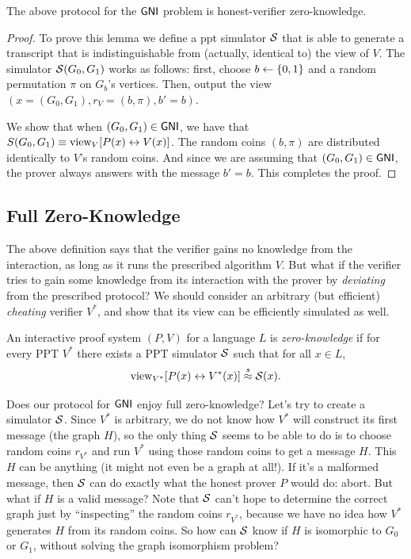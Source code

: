 \documentclass[11pt]{article}
\begin{document}
\begin{lemma}
  \label{lem:gni-hvzk}
  The above protocol for the $\mathsf{GNI}$ problem is honest-verifier
  zero-knowledge.
\end{lemma}

\begin{proof}
  To prove this lemma we define a ppt simulator $\mathcal{S}$ that is able to
  generate a transcript that is indistinguishable from (actually,
  identical to) the view of $V$. The simulator $\mathcal{S}(G_{0}, G_{1})$
  works as follows: first, choose $b \gets \{0,1\}$ and a random
  permutation $\pi$ on $G_{b}$'s vertices.  Then, output the view $(x
  = (G_{0}, G_{1}), r_V=(b,\pi), b' = b)$.
  
  We show that when $(G_0,G_1) \in \mathsf{GNI}$, we have that $S(G_0,G_1)
  \equiv \text{view}_V[P(x)\leftrightarrow V(x)]$.  The random coins
  $(b,\pi)$ are distributed identically to $V$'s random coins.  And
  since we are assuming that $(G_0,G_1) \in \mathsf{GNI}$, the prover always
  answers with the message $b'=b$.  This completes the proof.
\end{proof}

\subsection{Full Zero-Knowledge}
\label{sec:full-zero-knowledge}

The above definition says that the verifier gains no knowledge from
the interaction, as long as it runs the prescribed algorithm $V$.  But
what if the verifier tries to gain some knowledge from its interaction
with the prover by \emph{deviating} from the prescribed protocol?  We
should consider an arbitrary (but efficient) \emph{cheating} verifier
$V^{*}$, and show that its view can be efficiently simulated as well.

\begin{definition}
  \label{def:zk}
  An interactive proof system $(P,V)$ for a language $L$ is
  \emph{zero-knowledge} if for every PPT $V^{*}$ there exists a
  PPT simulator $\mathcal{S}$ such that for all $x \in L$, \[ \text{view}_{V^{*}}[
  P(x) \leftrightarrow V^{*}(x) ] \stackrel{s}{\approx} \mathcal{S}(x). \]
\end{definition}

Does our protocol for $\mathsf{GNI}$ enjoy full zero-knowledge?  Let's try to
create a simulator $\mathcal{S}$.  Since $V^{*}$ is arbitrary, we do not know
how $V^*$ will construct its first message (the graph $H$), so the
only thing $\mathcal{S}$ seems to be able to do is to choose random coins
$r_{V^*}$ and run $V^*$ using those random coins to get a message $H$.
This $H$ can be anything (it might not even be a graph at all!).  If
it's a malformed message, then $\mathcal{S}$ can do exactly what the honest
prover $P$ would do: abort.  But what if $H$ is a valid message?  Note
that $\mathcal{S}$ can't hope to determine the correct graph just by
``inspecting'' the random coins $r_{V^{*}}$, because we have no idea
how $V^{*}$ generates $H$ from its random coins.  So how can $\mathcal{S}$
know if $H$ is isomorphic to $G_0$ or $G_1$, without solving the graph
isomorphism problem?
\end{document}
